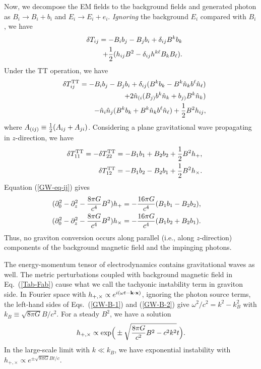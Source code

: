 \documentclass[twocolumn,amsmath,amssymb]{revtex4}
\newcommand{\bea}{\begin{eqnarray}}
\newcommand{\eea}{\end{eqnarray}}
\begin{document}
Now, we decompose the EM fields to the background fields and generated photon as $B_i \rightarrow B_i + b_i$ and $E_i \rightarrow E_i + e_i$. {\it Ignoring} the background $E_i$ compared with $B_i$, we have
\bea
   & & \delta T_{ij} = - B_i b_j - B_j b_i
       + \delta_{ij} B^k b_k
   \nonumber \\
   & & \qquad
       + {1 \over 2} ( h_{ij} B^2
       - \delta_{ij} h^{k\ell} B_k B_\ell ).
\eea
Under the TT operation, we have
\bea
   & &
       \delta T_{ij}^{\rm TT}
       = - B_i b_j - B_j b_i
       + \delta_{ij} ( B^k b_k
       - B^k \hat n_k b^\ell \hat n_\ell )
   \nonumber \\
   & & \qquad
       + 2 \hat n_{(i} ( B_{j)} b^k \hat n_k
       + b_{j)} B^k \hat n_k )
   \nonumber \\
   & & \qquad
       - \hat n_i \hat n_j ( B^k b_k
       + B^k \hat n_k b^\ell \hat n_\ell )
       + {1 \over 2} B^2 h_{ij},
\eea
where $A_{(ij)} \equiv {1 \over 2} (A_{ij} + A_{ji})$. Considering a plane gravitational wave propagating in $z$-direction, we have
\bea
   & & \delta T_{11}^{\rm TT}
       = - \delta T_{22}^{\rm TT}
       = - B_1 b_1 + B_2 b_2
       + {1 \over 2} B^2 h_+,
   \nonumber \\
   & & \delta T_{12}^{\rm TT}
       = - B_1 b_2 - B_2 b_1
       + {1 \over 2} B^2 h_\times.
\eea
Equation (\ref{GW-eq-ij}) gives
\bea
   & & \hskip -.8cm
       ( \partial_0^2 - \partial_z^2
       - {8 \pi G \over c^4} B^2 ) h_+
       = - {16 \pi G \over c^4} (B_1 b_1 - B_2 b_2 ),
   \label{GW-B-1} \\
   & & \hskip -.8cm
       ( \partial_0^2 - \partial_z^2
       - {8 \pi G \over c^4} B^2 ) h_\times
       = - {16 \pi G \over c^4} (B_1 b_2 + B_2 b_1 ).
   \label{GW-B-2}
\eea
Thus, no graviton conversion occurs along parallel (i.e., along $z$-direction) components of the background magnetic field and the impinging photons.

The energy-momentum tensor of electrodynamics contains gravitational waves as well. The metric perturbations coupled with background magnetic field in Eq.\ (\ref{Tab-Fab}) cause what we call the tachyonic instability term in graviton side. In Fourier space with $h_{+,\times} \propto e^{i(\omega t - {\bf k} \cdot {\bf x})}$, %
ignoring the photon source terms, the left-hand sides of Eqs.\ (\ref{GW-B-1}) and (\ref{GW-B-2}) give $\omega^2/c^2 = k^2 - k_B^2$ with $k_B \equiv \sqrt{8 \pi G} B/ c^2$. For a steady $B^2$, we have a solution
\bea
   h_{+,\times} \propto {\rm exp} \Big( \pm
       \sqrt{ {8 \pi G \over c^2} B^2 - c^2 k^2 } t \Big).
\eea
In the large-scale limit with $k \ll k_B$, we have exponential instability with $h_{+,\times} \propto e^{\pm \sqrt{8 \pi G} B t/c}$.
\end{document}

